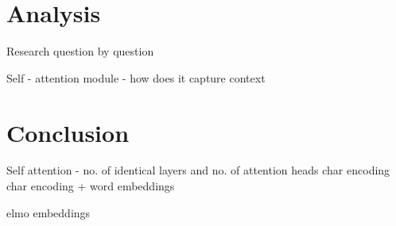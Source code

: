 \documentclass[a4paper, 11pt]{article}
\begin{document}



\pagebreak
\section{Analysis}
Research question by question

Self - attention module - how does it capture context 
\pagebreak
\section{Conclusion}

Self attention - no. of identical layers and no. of attention heads
char encoding
char encoding + word embeddings

elmo embeddings
 


\newpage
\printbibliography
%
\end{document}
